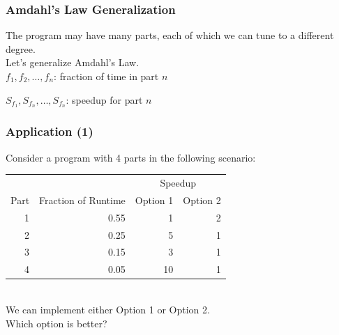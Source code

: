 \documentclass[aspectratio=43]{beamer}
\begin{document}
\begin{frame}
  \frametitle{Amdahl's Law Generalization}

  \hspace*{2em} \begin{minipage}{.8\textwidth} The program may have many parts, each of which we can tune to
  a different degree.\\[1em]

  Let's generalize Amdahl's Law.\\[1em]

  $f_1, f_2, \ldots, f_n$: fraction of time in part $n$

  $S_{f_1}, S_{f_n}, \ldots, S_{f_n}$: speedup for part $n$
\end{minipage}
  \vfill
  \begin{center}
  \structure{\[\mbox{\em speedup} = \frac{1}{\frac{f_1}{S_{f_1}} + \frac{f_2}{S_{f_2}} + \ldots +
    \frac{f_n}{S_{f_n}}}\]}
  \end{center}
\end{frame}

\begin{frame}
  \frametitle{Application (1)}

  \hspace*{2em} 
  \begin{minipage}{.8\textwidth} Consider a program with 4 parts in the following scenario:\\[2em]
    \begin{tabular}{r|r|r|r}
    \multicolumn{2}{l}{} & \multicolumn{2}{c}{Speedup} \\
    Part & Fraction of Runtime & Option 1 & Option 2\\
    \hline
    1 & 0.55 & 1  & 2\\
    2 & 0.25 & 5  & 1\\
    3 & 0.15 & 3  & 1\\
    4 & 0.05  & 10 & 1\\
  \end{tabular}

~\\[2em]
  We can implement either Option 1 or Option 2. \\
  Which option is better?
  \end{minipage}
\end{frame}
\end{document}
